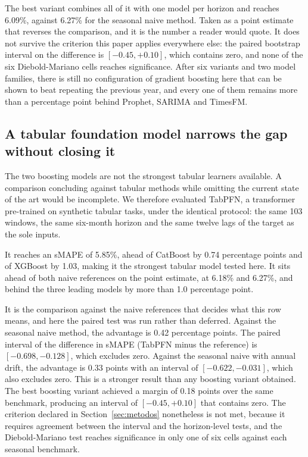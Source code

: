 The best variant combines all of it with one model per horizon and reaches 6.09\%,
against 6.27\% for the seasonal naive method. Taken as a point estimate that reverses the
comparison, and it is the number a reader would quote. It does not survive the criterion
this paper applies everywhere else: the paired bootstrap interval on the difference is
$[-0.45, +0.10]$, which contains zero, and none of the six Diebold-Mariano
cells reaches significance. After six variants and two model families, there is still no
configuration of gradient boosting here that can be shown to beat repeating the previous
year, and every one of them remains more than a percentage point behind Prophet, SARIMA and
TimesFM.

\subsection{A tabular foundation model narrows the gap without closing it}

The two boosting models are not the strongest tabular learners available. A comparison
concluding against tabular methods while omitting the current state of the art would be
incomplete. We therefore evaluated TabPFN, a transformer pre-trained on synthetic tabular
tasks, under the identical protocol: the same 103 windows, the same six-month horizon and the
same twelve lags of the target as the sole inputs.

It reaches an sMAPE of 5.85\%, ahead of CatBoost by 0.74 percentage points and of XGBoost by
1.03, making it the strongest tabular model tested here. It sits ahead of both naive
references on the point estimate, at 6.18\% and 6.27\%, and behind the three leading models
by more than 1.0 percentage point.

It is the comparison against the naive references that decides what this row means, and
here the paired test was run rather than deferred. Against the seasonal naive method, the
advantage is 0.42 percentage points. The paired interval of the difference in sMAPE
(TabPFN minus the reference) is $[-0.698, -0.128]$, which excludes zero. Against the
seasonal naive with annual drift, the advantage is 0.33 points with an interval of
$[-0.622, -0.031]$, which also excludes zero. This is a stronger result than any boosting
variant obtained. The best boosting variant achieved a margin of 0.18 points over the same
benchmark, producing an interval of $[-0.45, +0.10]$ that contains zero.
The criterion declared in Section~\ref{sec:metodos} nonetheless is not met, because it
requires agreement between the interval and the horizon-level tests, and the
Diebold-Mariano test reaches significance in only one of six cells against each seasonal
benchmark.

